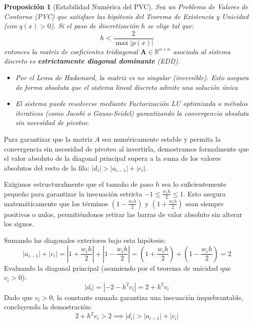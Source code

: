 \documentclass[12pt]{article}
\newtheorem{proposicion}{Proposición}
\begin{document}
\begin{proposicion} [Estabilidad Numérica del PVC]
Sea un Problema de Valores de Contorno (PVC) que satisface las hipótesis del Teorema de Existencia y Unicidad (con $q(x) > 0$). Si el paso de discretización $h$ se elige tal que:
\[ h < \frac{2}{\max |p(x)|} \]
entonces la matriz de coeficientes tridiagonal $\mathbf{A} \in \mathbb{R}^{n \times n}$ asociada al sistema discreto es \textbf{estrictamente diagonal dominante} (EDD).
\begin{itemize}
    \item {Por el Lema de Hadamard, la matriz es no singular (inversible). Esto asegura de forma absoluta que el sistema lineal discreto admite una solución única}
    \item {El sistema puede resolverse mediante Factorización LU optimizada o métodos iterativos (como Jacobi o Gauss-Seidel) garantizando la convergencia absoluta sin necesidad de pivoteo.}
\end{itemize}
\end{proposicion} 

Para garantizar que la matriz $A$ sea numéricamente estable y permita la convergencia sin necesidad de pivoteo al invertirla, demostramos formalmente que el valor absoluto de la diagonal principal supera a la suma de los valores absolutos del resto de la fila: $|d_i| > |a_{i-1}| + |c_i|$.

 Exigimos estructuralmente que el tamaño de paso $h$ sea lo suficientemente pequeño para garantizar la inecuación estricta $-1 \le \frac{w_i h}{2} \le 1$. Esto asegura matemáticamente que los términos $\left(1 - \frac{w_i h}{2}\right)$ y $\left(1 + \frac{w_i h}{2}\right)$ sean siempre positivos o nulos, permitiéndonos retirar las barras de valor absoluto sin alterar los signos.

Sumando las diagonales exteriores bajo esta hipótesis:
\begin{equation}
    |a_{i-1}| + |c_i| = \left|1 + \frac{w_i h}{2}\right| + \left|1 - \frac{w_i h}{2}\right| = \left(1 + \frac{w_i h}{2}\right) + \left(1 - \frac{w_i h}{2}\right) = 2
\end{equation}
Evaluando la diagonal principal (asumiendo por el teorema de unicidad que $v_i > 0$):
\begin{equation}
    |d_i| = |-2 - h^2 v_i| = 2 + h^2 v_i
\end{equation}
Dado que $v_i > 0$, la constante sumada garantiza una inecuación inquebrantable, concluyendo la demostración:
\begin{equation}
    2 + h^2 v_i > 2 \implies |d_i| > |a_{i-1}| + |c_i|
\end{equation}
\end{document}
